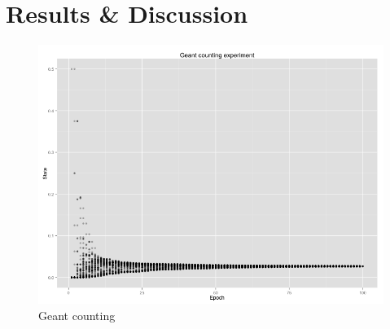 \section{Results \& Discussion}

\begin{figure}[h!]
    \begin{center}
    \includegraphics[width=\linewidth]{figures/geant_counting_exp.png}
    \end{center}
    \caption{Geant counting}
    \label{fig:geant}
\end{figure}
\label{sec:results}
